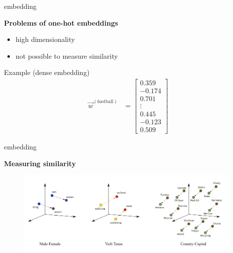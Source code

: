 \begin{vbframe}{embedding}

\vfill

\textbf{Problems of one-hot embeddings}

\begin{itemize}
	\item high dimensionality
	\item not possible to measure similarity
\end{itemize}

\begin{exampleblock}{Example (dense embedding)}
	\begin{align*}
				\vec w^{({\text{football}})} &= \begin{bmatrix}
            0.359 \\
           -0.174 \\
            0.701 \\
           \vdots \\
            0.445 \\
           -0.123 \\
            0.509 
         \end{bmatrix}
	\end{align*}
\end{exampleblock}

\vfill

\end{vbframe}


\begin{frame}{embedding}
	
\vfill

\textbf{Measuring similarity}

\begin{figure}
	\centering
		\includegraphics[width = 11cm]{figure/linear-relationships.png}\\ 
\end{figure}

\vfill
	
\end{frame}

